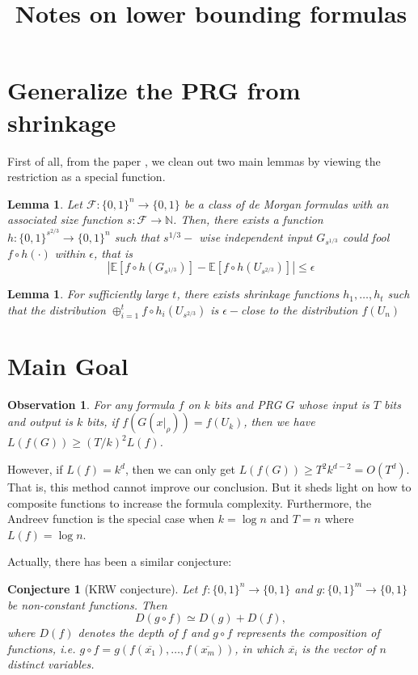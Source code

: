 \documentclass[12pt]{article}
\title{Notes on lower bounding formulas}
\newtheorem{lemma}[theorem]{Lemma}
\newtheorem{ob}[theorem]{Observation}
\newtheorem{conjecture}[theorem]{Conjecture}
\renewcommand{\.}{,\ldots,}
\begin{document}
		\maketitle 
		
\newcommand{\F}{\mathcal{F}}		
\newcommand{\E}{\mathbb{E}}		
\section{Generalize the PRG from shrinkage}	

First of all, from the paper \cite{impagliazzo2012pseudorandomness}, we clean out two main lemmas by viewing the restriction as a special function. 
\begin{lemma}
Let $\F:\{0,1\}^n\rightarrow \{0,1\}$ be a class of de Morgan formulas with an associated size function $s:\F \rightarrow \mathbb{N}$. Then, there exists a function $h:\{0,1\}^{s^{2/3}}\rightarrow \{0,1\}^n$ such that $s^{1/3}-$ wise independent input $G_{s^{1/3}}$ could fool $f\circ h(\cdot )$ within $\epsilon$, that is 
$$|\E[f\circ h(G_{s^{1/3}})]-\E[f\circ h(U_{s^{2/3}})]|\leq \epsilon$$
\end{lemma}

\begin{lemma}
For sufficiently large $t$, there exists shrinkage functions $h_1\.h_t$ such that the distribution $\oplus_{i=1}^t f\circ h_i(U_{s^{2/3}})$ is $\epsilon-$close to the distribution $f(U_{n})$
\end{lemma}

\section{Main Goal}
\begin{ob}
	For any formula $f$ on $k$ bits and PRG $G$ whose input is $T$ bits and output is $k$ bits, if $f( G(x|_\rho))=f(U_k)$, then we have 
	$L(f (G))\geq (T/k)^2 L(f)$.
\end{ob}
However, if $L(f)=k^d$, then we can only get $L(f(G))\geq T^2k^{d-2}=O(T^d) $. That is, this method cannot improve our conclusion. But it sheds light on how to composite functions to increase the formula complexity.   Furthermore, the Andreev function is the special case when $k=\log n$ and $T=n$ where $L(f)=\log n$. 


Actually, there has been a similar conjecture: 
\begin{conjecture}[KRW conjecture]
Let $f : \{0, 1\}^n\rightarrow \{0, 1\}$ and $g : \{0, 1\}^m \rightarrow \{0, 1\}$ be non-constant functions. Then
$$D(g \circ f) \simeq D(g) + D(f),$$
where $D(f)$ denotes the depth of $f$ and $g\circ f$ represents the composition of functions, i.e. $g\circ f=g(f(\overline{x_1}),\ldots, f(\overline{x_m}))$, in which $\overline{x_i}$ is the vector of $n$ distinct variables. 
\end{conjecture}
\end{document}
